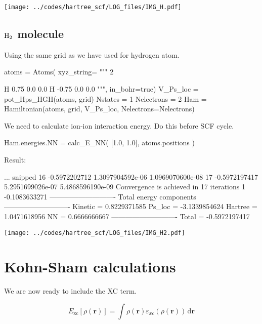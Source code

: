 \begin{center}
\texttt{[image: ../codes/hartree\_scf/LOG\_files/IMG\_H.pdf]}
\end{center}


\subsection{$\ce{H2}$ molecule}


Using the same grid as we have used for hydrogen atom.

\begin{juliacode}
atoms = Atoms( xyz_string=
  """
  2
  
  H   0.75  0.0  0.0
  H  -0.75  0.0  0.0
  """, in_bohr=true)
V_Ps_loc = pot_Hps_HGH(atoms, grid)
Nstates = 1
Nelectrons = 2
Ham = Hamiltonian(atoms, grid, V_Ps_loc, Nelectrons=Nelectrons)
\end{juliacode}

We need to calculate ion-ion interaction energy. Do this before SCF cycle.

\begin{juliacode}
Ham.energies.NN = calc_E_NN( [1.0, 1.0], atoms.positions )
\end{juliacode}

Result:
\begin{textcode}
... snipped
16      -0.5972202712   1.3097904592e-06   1.0969070600e-08
17      -0.5972197417   5.2951699026e-07   5.4868596190e-09
Convergence is achieved in 17 iterations
1      -0.1083633271
----------------------------
Total energy components
----------------------------
Kinetic =       0.8229371585
Ps_loc  =      -3.1339854624
Hartree =       1.0471618956
NN      =       0.6666666667
----------------------------
Total   =      -0.5972197417
\end{textcode}

\begin{center}
\texttt{[image: ../codes/hartree\_scf/LOG\_files/IMG\_H2.pdf]}
\end{center}


\section{Kohn-Sham calculations}

We are now ready to include the XC term.

\begin{equation}
E_{\mathrm{xc}}[\rho(\mathbf{r})] = \int \rho(\mathbf{r})
\varepsilon_{xc}(\rho(\mathbf{r}))\,\mathrm{d}\mathbf{r}
\end{equation}

